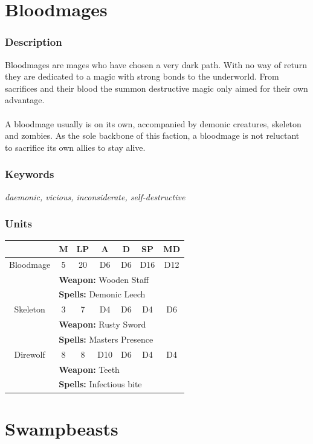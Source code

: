 \documentclass[a5paper,pagesize,10pt,bibtotoc,pointlessnumbers,
normalheadings,DIV=9,twoside=false]{scrbook}
\begin{document}
\newpage
\section{Bloodmages}

\subsubsection{Description}
Bloodmages are mages who have chosen a very dark path. With no way of return they are dedicated to a magic with strong bonds to the underworld.
From sacrifices and their blood the summon destructive magic only aimed for their own advantage.\\
\\
A bloodmage usually is on its own, accompanied by demonic creatures, skeleton and zombies. As the sole backbone of this faction, a bloodmage is not reluctant to sacrifice its own allies to stay alive.

\subsubsection{Keywords}
\emph{daemonic, vicious, inconsiderate, self-destructive}

\subsubsection{Units}
 \begin{tabular}{||c c c c c c c||} 
 \hline
  & M & LP & A & D & SP & MD \\
 \hline\hline
 Bloodmage & 5 & 20 & D6 & D6 & D16 & D12 \\ 
  & \multicolumn{6}{l||}{\textbf{Weapon:} Wooden Staff} \\
  & \multicolumn{6}{l||}{\textbf{Spells:} Demonic Leech} \\
 \hline
 Skeleton & 3 & 7 & D4 & D6 & D4 & D6 \\
  & \multicolumn{6}{l||}{\textbf{Weapon:} Rusty Sword} \\
  & \multicolumn{6}{l||}{\textbf{Spells:} Masters Presence} \\
\hline
 Direwolf & 8 & 8 & D10 & D6 & D4 & D4 \\
  & \multicolumn{6}{l||}{\textbf{Weapon:} Teeth} \\
  & \multicolumn{6}{l||}{\textbf{Spells:} Infectious bite} \\
\hline
\end{tabular}

\newpage
\section{Swampbeasts}
\end{document}
